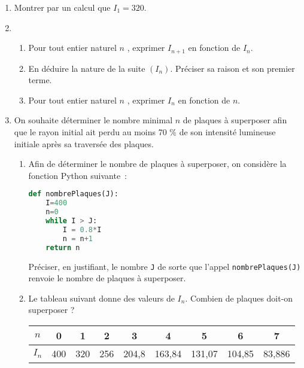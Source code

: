 \begin{enumerate}
     \item
     Montrer par un calcul que $I_{ 1 }=320.$
     \item
     \begin{enumerate}[label=\alph*.]
          \item
          Pour tout entier naturel $n$ , exprimer $I_{ n+1 }$ en fonction de $I_{ n }.$
          \item
          En déduire la nature de la suite $( I_{ n } ).$ Préciser sa raison et son premier terme.
          \item
          Pour tout entier naturel $n$ , exprimer $I_{ n }$ en fonction de $n. $
     \end{enumerate}
     \item
     On souhaite déterminer le nombre minimal $n$ de plaques à superposer afin que le rayon initial ait perdu au moins 70 \% de son intensité lumineuse initiale après sa traversée des plaques.
     \begin{enumerate}[label=\alph*.]
          \item
          Afin de déterminer le nombre de plaques à superposer, on considère la fonction Python suivante~:
\begin{lstlisting}[language=Python]
def nombrePlaques(J):
	I=400
	n=0
	while I > J:
		I = 0.8*I
		n = n+1
	return n
     \end{lstlisting}
     Préciser, en justifiant, le nombre \texttt{J} de sorte que l'appel \texttt{nombrePlaques(J)} renvoie le nombre de plaques à superposer.
     \item
     Le tableau suivant donne des valeurs de $I_{ n }.$ Combien de plaques doit-on superposer ?
     \begin{center}
          \begin{tabular}{|c|c|c|c|c|c|c|c|c|}%
               \hline
               $n$ &  0 & 1 & 2 & 3 & 4 & 5 & 6 & 7 \\
               \hline
               $I_{ n }$  & 400 & 320 & 256 & 204,8 & 163,84 & 131,07 & 104,85 & 83,886 \\
               \hline
          \end{tabular}
     \end{center}
\end{enumerate}
\end{enumerate}
